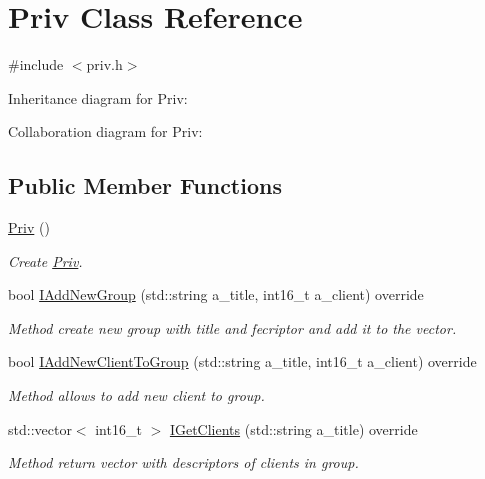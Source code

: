 \hypertarget{classPriv}{}\section{Priv Class Reference}
\label{classPriv}


{\ttfamily \#include $<$priv.\+h$>$}



Inheritance diagram for Priv\+:


Collaboration diagram for Priv\+:
\subsection*{Public Member Functions}
\begin{DoxyCompactItemize}
\item 
\hyperlink{classPriv_aadda11dccbb01f14e40797a4a3f62169}{Priv} ()\hypertarget{classPriv_aadda11dccbb01f14e40797a4a3f62169}{}\label{classPriv_aadda11dccbb01f14e40797a4a3f62169}

\begin{DoxyCompactList}\small\item\em Create \hyperlink{classPriv}{Priv}. \end{DoxyCompactList}\item 
bool \hyperlink{classPriv_ae4da67fa23671355729814f4d374a008}{I\+Add\+New\+Group} (std\+::string a\+\_\+title, int16\+\_\+t a\+\_\+client) override\hypertarget{classPriv_ae4da67fa23671355729814f4d374a008}{}\label{classPriv_ae4da67fa23671355729814f4d374a008}

\begin{DoxyCompactList}\small\item\em Method create new group with title and fecriptor and add it to the vector. \end{DoxyCompactList}\item 
bool \hyperlink{classPriv_a55467461c3e0607df0607e7a8cb0f028}{I\+Add\+New\+Client\+To\+Group} (std\+::string a\+\_\+title, int16\+\_\+t a\+\_\+client) override\hypertarget{classPriv_a55467461c3e0607df0607e7a8cb0f028}{}\label{classPriv_a55467461c3e0607df0607e7a8cb0f028}

\begin{DoxyCompactList}\small\item\em Method allows to add new client to group. \end{DoxyCompactList}\item 
std\+::vector$<$ int16\+\_\+t $>$ \hyperlink{classPriv_a8830a49028aeb8162f3c1c4d7692edf5}{I\+Get\+Clients} (std\+::string a\+\_\+title) override\hypertarget{classPriv_a8830a49028aeb8162f3c1c4d7692edf5}{}\label{classPriv_a8830a49028aeb8162f3c1c4d7692edf5}

\begin{DoxyCompactList}\small\item\em Method return vector with descriptors of clients in group. \end{DoxyCompactList}\end{DoxyCompactItemize}


